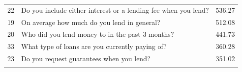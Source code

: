 \begin{longtable}[]{@{}lll@{}}
\begin{minipage}[t]{0.05\columnwidth}
22\strut
\end{minipage} & \begin{minipage}[t]{0.77\columnwidth}\raggedright
Do you include either interest or a lending fee when you lend?\strut
\end{minipage} & \begin{minipage}[t]{0.09\columnwidth}\raggedright
536.27\strut
\end{minipage}\tabularnewline
\begin{minipage}[t]{0.05\columnwidth}\raggedright
19\strut
\end{minipage} & \begin{minipage}[t]{0.77\columnwidth}\raggedright
On average how much do you lend in general?\strut
\end{minipage} & \begin{minipage}[t]{0.09\columnwidth}\raggedright
512.08\strut
\end{minipage}\tabularnewline
\begin{minipage}[t]{0.05\columnwidth}\raggedright
20\strut
\end{minipage} & \begin{minipage}[t]{0.77\columnwidth}\raggedright
Who did you lend money to in the past 3 months?\strut
\end{minipage} & \begin{minipage}[t]{0.09\columnwidth}\raggedright
441.73\strut
\end{minipage}\tabularnewline
\begin{minipage}[t]{0.05\columnwidth}\raggedright
33\strut
\end{minipage} & \begin{minipage}[t]{0.77\columnwidth}\raggedright
What type of loans are you currently paying of?\strut
\end{minipage} & \begin{minipage}[t]{0.09\columnwidth}\raggedright
360.28\strut
\end{minipage}\tabularnewline
\begin{minipage}[t]{0.05\columnwidth}\raggedright
23\strut
\end{minipage} & \begin{minipage}[t]{0.77\columnwidth}\raggedright
Do you request guarantees when you lend?\strut
\end{minipage} & \begin{minipage}[t]{0.09\columnwidth}\raggedright
351.02\strut
\end{minipage}\tabularnewline
\begin{minipage}[t]{0.05\columnwidth}\raggedright

\end{minipage}
\end{longtable}
